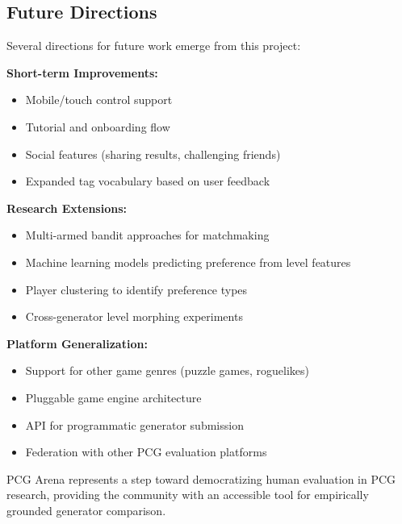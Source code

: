 \documentclass[11pt,a4paper]{article}
\theoremstyle{plain}
\theoremstyle{definition}
\theoremstyle{remark}
\begin{document}
\subsection{Future Directions}
\label{subsec:future}

Several directions for future work emerge from this project:

\textbf{Short-term Improvements:}
\begin{itemize}
    \item Mobile/touch control support
    \item Tutorial and onboarding flow
    \item Social features (sharing results, challenging friends)
    \item Expanded tag vocabulary based on user feedback
\end{itemize}

\textbf{Research Extensions:}
\begin{itemize}
    \item Multi-armed bandit approaches for matchmaking
    \item Machine learning models predicting preference from level features
    \item Player clustering to identify preference types
    \item Cross-generator level morphing experiments
\end{itemize}

\textbf{Platform Generalization:}
\begin{itemize}
    \item Support for other game genres (puzzle games, roguelikes)
    \item Pluggable game engine architecture
    \item API for programmatic generator submission
    \item Federation with other PCG evaluation platforms
\end{itemize}

PCG Arena represents a step toward democratizing human evaluation in PCG research, providing the community with an accessible tool for empirically grounded generator comparison.

\newpage

% 
\end{document}
